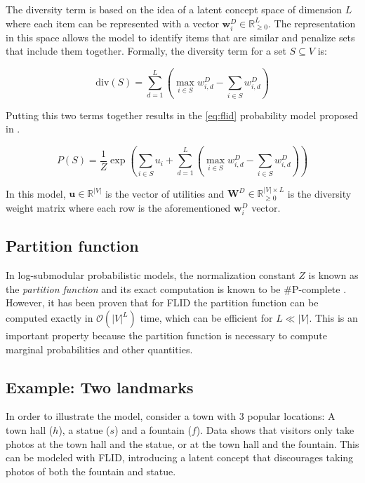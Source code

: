 The diversity term is based on the idea of a latent concept space of dimension $L$ where each item can be represented with a vector $\mathbf{w}^{D}_{i} \in \mathbb{R}^{L}_{\geq 0}$. The representation in this space allows the model to identify items that are similar and penalize sets that include them together. Formally, the diversity term for a set $S \subseteq V$ is:

\begin{equation}
  \label{eq:diversity}
  \mathrm{div}(S) = \sum_{d=1}^{L}\left(\max_{i \in S}{w^{D}_{i, d}} - \sum_{i \in S}{w^{D}_{i,d}}\right)
\end{equation}

Putting this two terms together results in the \ref{eq:flid} probability model proposed in \cite{tschiatschek16learning}.

\begin{equation}
  \tag{FLID}
  P(S) = \frac{1}{Z}\exp{\left(\sum_{i \in S}u_{i} + \sum_{d=1}^{L}\left(\max_{i \in S}{w^{D}_{i, d}} - \sum_{i \in S}{w^{D}_{i,d}}\right)\right)}
  \label{eq:flid}
\end{equation}

In this model, $\mathbf{u} \in \mathbb{R}^{|V|}$ is the vector of utilities and $\mathbf{W}^{D} \in \mathbb{R}_{\geq 0}^{|V| \times L}$ is the diversity weight matrix where each row is the aforementioned $\mathbf{w}^{D}_{i}$ vector.

\subsection{Partition function}

In log-submodular probabilistic models, the normalization constant $Z$ is known as the \textit{partition function} \cite{djolonga14variational} and its exact computation is known to be \#P-complete \cite{jerrum1990}.  However, it has been proven \cite{tschiatschek16learning} that for FLID the partition function can be computed exactly in $\mathcal{O}(|V|^L)$ time, which can be efficient for $L \ll |V|$. This is an important property because the partition function is necessary to compute marginal probabilities and other quantities.

\subsection{Example: Two landmarks}
\label{sec:flid-toy}

In order to illustrate the model, consider a town with 3 popular locations: A town hall ($h$), a statue ($s$) and a fountain ($f$). Data shows that visitors only take photos at the town hall and the statue, or at the town hall and the fountain. This can be modeled with FLID, introducing a latent concept that discourages taking photos of both the fountain and statue.

